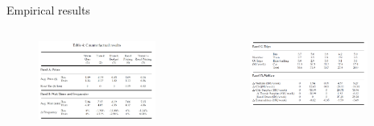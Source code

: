 \documentclass[10pt, aspectratio=169]{beamer}
\begin{document}
\begin{frame}{Empirical results}
  \begin{columns}[T,onlytextwidth]

    \begin{figure}
      \centering
      \includegraphics[width=0.9\textwidth]{../Figures/counter1.png}
    \end{figure}


    \begin{figure}
      \centering
      \includegraphics[width=0.9\textwidth]{../Figures/counter2.png}
    \end{figure}
  \end{columns}
\end{frame}
\end{document}
